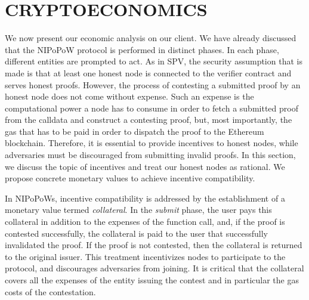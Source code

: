 \chapter{CRYPTOECONOMICS}

We now present our economic analysis on our client. We have
already discussed that the NIPoPoW protocol is performed in distinct phases. In
each phase, different entities are prompted to act. As in SPV, the security
assumption that is made is that at least one honest node is connected to the
verifier contract and serves honest proofs. However, the process of contesting
a submitted proof by an honest node does not come without expense.  Such an
expense is the computational power a node has to consume in order to fetch a
submitted proof from the calldata and construct a contesting proof, but, most
importantly, the gas that has to be paid in order to dispatch the proof to
the Ethereum blockchain. Therefore, it is essential to provide incentives to
honest nodes, while adversaries must be discouraged from
submitting invalid proofs. In this section, we discuss the topic of incentives
and treat our honest nodes as rational. We propose concrete monetary values
to achieve incentive compatibility.

In NIPoPoWs, incentive compatibility is addressed by the establishment of a
monetary value termed \emph{collateral}. In the \emph{submit} phase, the user
pays this collateral in addition to the expenses of the function call, and, if
the proof is contested successfully, the collateral is paid to the user that
successfully invalidated the proof. If the proof is not contested, then the
collateral is returned to the original issuer. This treatment incentivizes
nodes to participate to the protocol, and discourages adversaries from joining.
It is critical that the collateral covers all the expenses of the entity
issuing the contest and in particular the gas costs of the contestation.


